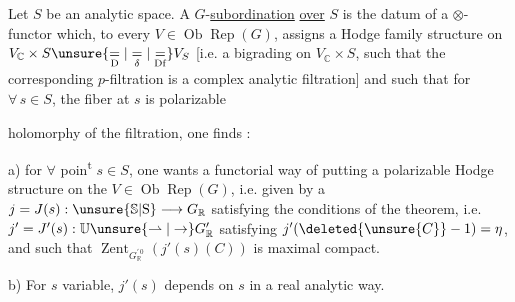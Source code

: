 
Let $S$ be an analytic space. A  $G$-\uline{subordination} \uline{over} $S$ is the datum of a $\otimes$-functor which, to every $V\in\operatorname{Ob}\operatorname{Rep}(G)$, assigns a Hodge family structure  on $V_{\mathbb{C}}\times S\unsure{\underset{\mathrm{D}}{=}|\underset{\delta}{=}|\underset{\mathrm{Df}}{=}}V_S$  [i.e. a  bigrading on $V_{\mathbb{C}}\times S$,  such that the corresponding $p$-filtration is a complex analytic filtration] and such that   for  $\forall\,s\in S$, the fiber at $s$ is polarizable 

 holomorphy of the filtration, one finds :

a) for $\forall$ poin\textsuperscript{t} $s\in S$, one wants a functorial way  of putting a polarizable Hodge structure  on the $V\in\operatorname{Ob}\operatorname{Rep}(G)$, i.e. given by a $j=J(s):\unsure{\mathbb{S}|\mathrm{S}}\longrightarrow G_{\mathbb{R}}$ satisfying the conditions of the theorem, i.e. $j'=J'(s):\mathbb{U}\unsure{\rightharpoonup|\to}G'_{\mathbb{R}}$ satisfying $j'(\deleted{\unsure{C}}-1)=\eta$, and such that $\operatorname{Zent}_{G_{\mathbb{R}}^{\prime\,0}}(j'(s)(C))$ is maximal compact.

b) For $s$ variable, $j'(s)$ depends on $s$ in a real analytic way.
